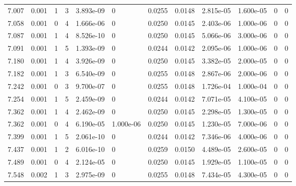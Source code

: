 \documentclass[preview]{standalone}
\begin{document}
{{{{{\begin{tabular}{L{1.2cm}C{1.2cm} C{0.3cm}C{0.5cm} C{1.4cm}C{1.4cm} C{1.4cm}C{1.4cm} C{1.6cm}C{1.6cm} C{1.6cm}C{1.6cm}}
  7.007  &  0.001  & 1     &  3 &  3.893e-09  & 0  &  0.0255&   0.0148& 2.815e-05 & 1.600e-05   &  0 & 0  \\ 
  7.058  &  0.001  & 0     &  4 &  1.666e-06  & 0  &  0.0250&   0.0145& 2.403e-06 & 1.000e-06   &  0 & 0  \\ 
  7.087  &  0.001  & 1     &  4 &  8.526e-10  & 0  &  0.0250&   0.0145& 5.066e-06 & 3.000e-06   &  0 & 0  \\ 
  7.091  &  0.001  & 1     &  5 &  1.393e-09  & 0  &  0.0244&   0.0142& 2.095e-06 & 1.000e-06   &  0 & 0  \\ 
  7.180  &  0.001  & 1     &  4 &  3.926e-09  & 0  &  0.0250&   0.0145& 3.382e-05 & 2.000e-05   &  0 & 0  \\ 
  7.182  &  0.001  & 1     &  3 &  6.540e-09  & 0  &  0.0255&   0.0148& 2.867e-06 & 2.000e-06   &  0 & 0  \\ 
  7.242  &  0.001  & 0     &  3 &  9.700e-07  & 0  &  0.0255&   0.0148& 1.726e-04 & 1.000e-04   &  0 & 0  \\ 
  7.254  &  0.001  & 1     &  5 &  2.459e-09  & 0  &  0.0244&   0.0142& 7.071e-05 & 4.100e-05   &  0 & 0  \\ 
  7.362  &  0.001  & 1     &  4 &  2.462e-09  & 0  &  0.0250&   0.0145& 2.298e-05 & 1.300e-05   &  0 & 0  \\ 
  7.362  &  0.001  & 0     &  4 &  6.190e-05  & 1.000e-06  &  0.0250&   0.0145& 1.230e-05 & 7.000e-06   &  0 & 0  \\ 
  7.399  &  0.001  & 1     &  5 &  2.061e-10  & 0  &  0.0244&   0.0142& 7.346e-06 & 4.000e-06   &  0 & 0  \\ 
  7.437  &  0.001  & 1     &  2 &  6.016e-10  & 0  &  0.0259&   0.0150& 4.489e-05 & 2.600e-05   &  0 & 0  \\ 
  7.489  &  0.001  & 0     &  4 &  2.124e-05  & 0  &  0.0250&   0.0145& 1.929e-05 & 1.100e-05   &  0 & 0  \\ 
  7.548  &  0.002  & 1     &  3 &  2.975e-09  & 0  &  0.0255&   0.0148& 7.434e-05 & 4.300e-05   &  0 & 0  \\ 
\hline 
\end{tabular} 

}}}}}
\end{document}
